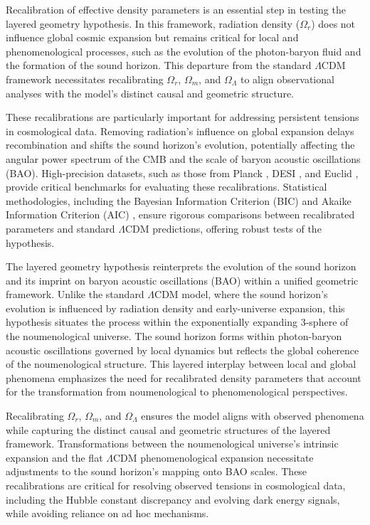 \documentclass[aps,rmp,groupedaddress,twocolumn,10pt]{revtex4-2}
\begin{document}
Recalibration of effective density parameters is an essential step in testing the layered geometry hypothesis. In this framework, radiation density ($\Omega_r$) does not influence global cosmic expansion but remains critical for local and phenomenological processes, such as the evolution of the photon-baryon fluid and the formation of the sound horizon. This departure from the standard $\Lambda$CDM framework necessitates recalibrating $\Omega_r$, $\Omega_m$, and $\Omega_\Lambda$ to align observational analyses with the model's distinct causal and geometric structure.

These recalibrations are particularly important for addressing persistent tensions in cosmological data. Removing radiation's influence on global expansion delays recombination and shifts the sound horizon's evolution, potentially affecting the angular power spectrum of the CMB and the scale of baryon acoustic oscillations (BAO). High-precision datasets, such as those from Planck \cite{Aghanim2020}, DESI \cite{Aghamousa2016}, and Euclid \cite{Laureijs2011}, provide critical benchmarks for evaluating these recalibrations. Statistical methodologies, including the Bayesian Information Criterion (BIC) \cite{Schwarz1978} and Akaike Information Criterion (AIC) \cite{Akaike1974}, ensure rigorous comparisons between recalibrated parameters and standard $\Lambda$CDM predictions, offering robust tests of the hypothesis.

The layered geometry hypothesis reinterprets the evolution of the sound horizon and its imprint on baryon acoustic oscillations (BAO) within a unified geometric framework. Unlike the standard $\Lambda$CDM model, where the sound horizon's evolution is influenced by radiation density and early-universe expansion, this hypothesis situates the process within the exponentially expanding 3-sphere of the noumenological universe. The sound horizon forms within photon-baryon acoustic oscillations governed by local dynamics but reflects the global coherence of the noumenological structure. This layered interplay between local and global phenomena emphasizes the need for recalibrated density parameters that account for the transformation from noumenological to phenomenological perspectives.

Recalibrating $\Omega_r$, $\Omega_m$, and $\Omega_\Lambda$ ensures the model aligns with observed phenomena while capturing the distinct causal and geometric structures of the layered framework. Transformations between the noumenological universe's intrinsic expansion and the flat $\Lambda$CDM phenomenological expansion necessitate adjustments to the sound horizon's mapping onto BAO scales. These recalibrations are critical for resolving observed tensions in cosmological data, including the Hubble constant discrepancy and evolving dark energy signals, while avoiding reliance on ad hoc mechanisms.
\end{document}
